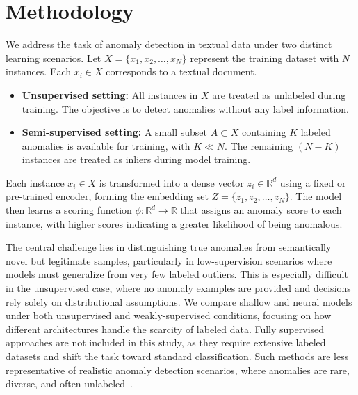 \documentclass[12pt]{article}
\begin{document}
\section{Methodology}


We address the task of anomaly detection in textual data under two distinct learning scenarios. Let $X = \{x_1, x_2, \dots, x_N\}$ represent the training dataset with $N$ instances. Each $x_i \in X$ corresponds to a textual document.

\begin{itemize}
    \item \textbf{Unsupervised setting:} All instances in $X$ are treated as unlabeled during training. The objective is to detect anomalies without any label information.

    \item \textbf{Semi-supervised setting:} A small subset $A \subset X$ containing $K$ labeled anomalies is available for training, with $K \ll N$. The remaining $(N-K)$ instances are treated as inliers during model training.
\end{itemize}

Each instance $x_i \in X$ is transformed into a dense vector $z_i \in \mathbb{R}^d$ using a fixed or pre-trained encoder, forming the embedding set $Z = \{z_1, z_2, \dots, z_N\}$. The model then learns a scoring function $\phi : \mathbb{R}^d \rightarrow \mathbb{R}$ that assigns an anomaly score to each instance, with higher scores indicating a greater likelihood of being anomalous.

The central challenge lies in distinguishing true anomalies from semantically novel but legitimate samples, particularly in low-supervision scenarios where models must generalize from very few labeled outliers. This is especially difficult in the unsupervised case, where no anomaly examples are provided and decisions rely solely on distributional assumptions. We compare shallow and neural models under both unsupervised and weakly-supervised conditions, focusing on how different architectures handle the scarcity of labeled data. Fully supervised approaches are not included in this study, as they require extensive labeled datasets and shift the task toward standard classification. Such methods are less representative of realistic anomaly detection scenarios, where anomalies are rare, diverse, and often unlabeled~\cite{Chandola2009AnomalyDetection, pang2021deep}.
\end{document}

